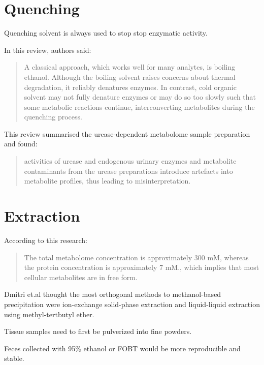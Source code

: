 \documentclass[
]{book}
\begin{document}
\hypertarget{quenching}{%
\section{Quenching}\label{quenching}}

Quenching solvent is always used to stop stop enzymatic activity.

In this review\citep{lu2017}, authors said:

\begin{quote}
A classical approach, which works well for many analytes, is boiling ethanol. Although the boiling solvent raises concerns about thermal degradation, it reliably denatures enzymes. In contrast, cold organic solvent may not fully denature enzymes or may do so too slowly such that some metabolic reactions continue, interconverting metabolites during the quenching process.
\end{quote}

This review\citep{kim2020} summarised the urease-dependent metabolome sample preparation and found:

\begin{quote}
activities of urease and endogenous urinary enzymes and metabolite contaminants from the urease preparations introduce artefacts into metabolite profiles, thus leading to misinterpretation.
\end{quote}

\hypertarget{extraction}{%
\section{Extraction}\label{extraction}}

According to this research\citep{bennett2009}:

\begin{quote}
The total metabolome concentration is approximately 300 mM, whereas the protein concentration is approximately 7 mM., which implies that most cellular metabolites are in free form.
\end{quote}

Dmitri et.al\citep{sitnikov2016} thought the most orthogonal methods to methanol-based precipitation were ion-exchange solid-phase extraction and liquid-liquid extraction using methyl-tertbutyl ether.

Tissue samples need to first be pulverized into fine powders.

Feces collected with 95\% ethanol or FOBT would be more reproducible and stable.
\end{document}
